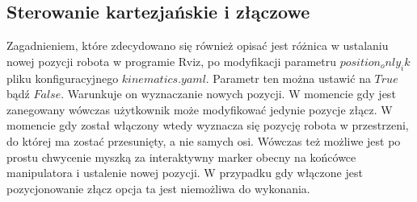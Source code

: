 \subsection{Sterowanie kartezjańskie i złączowe}

Zagadnieniem, które zdecydowano się również opisać jest różnica w ustalaniu nowej pozycji robota w programie Rviz, po modyfikacji parametru $position_only_ik$ pliku konfiguracyjnego $kinematics.yaml$. Parametr ten można ustawić na $True$ bądź $False$. Warunkuje on wyznaczanie nowych pozycji. W momencie gdy jest zanegowany wówczas użytkownik może modyfikować jedynie pozycje złącz. W momencie gdy został włączony wtedy wyznacza się pozycję robota w przestrzeni, do której ma zostać przesunięty, a nie samych osi. Wówczas też możliwe jest po prostu chwycenie myszką za interaktywny marker obecny na końcówce manipulatora i ustalenie nowej pozycji. W przypadku gdy włączone jest pozycjonowanie złącz opcja ta jest niemożliwa do wykonania. 



